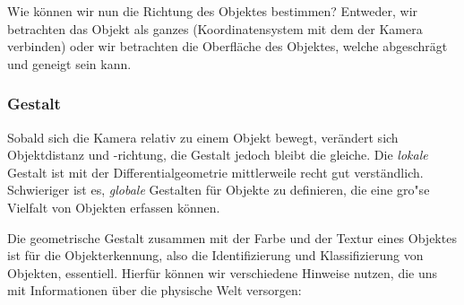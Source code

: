 Wie können wir nun die Richtung des Objektes bestimmen? Entweder, wir betrachten das Objekt als ganzes (Koordinatensystem mit dem der Kamera verbinden) oder wir betrachten die Oberfläche des Objektes, welche abgeschrägt und geneigt sein kann.

\subsubsection{Gestalt}

Sobald sich die Kamera relativ zu einem Objekt bewegt, verändert sich Objektdistanz und -richtung, die Gestalt jedoch bleibt die gleiche. Die \textit{lokale} Gestalt ist mit der Differentialgeometrie mittlerweile recht gut verständlich. Schwieriger ist es, \textit{globale} Gestalten für Objekte zu definieren, die eine gro"se Vielfalt von Objekten erfassen können.

Die geometrische Gestalt zusammen mit der Farbe und der Textur eines Objektes ist für die Objekterkennung, also die Identifizierung und Klassifizierung von Objekten, essentiell. Hierfür können wir verschiedene Hinweise nutzen, die uns mit Informationen über die physische Welt versorgen:

